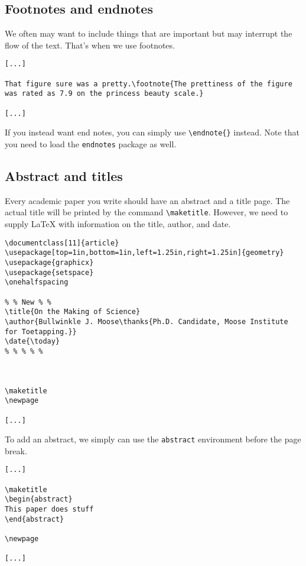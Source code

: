 \subsection{Footnotes and endnotes}

We often may want to include things that are important but may interrupt the flow of the text. That's when we use footnotes. 

\begin{lstlisting}
[...]

That figure sure was a pretty.\footnote{The prettiness of the figure was rated as 7.9 on the princess beauty scale.}

[...]
\end{lstlisting}

If you instead want end notes, you can simply use \verb|\endnote{}| instead. Note that you need to load the \texttt{endnotes} package as well.

\subsection{Abstract and titles}

Every academic paper you write should have an abstract and a title page. The actual title will be printed by the command \verb|\maketitle|. However, we need to supply \LaTeX{} with information on the title, author, and date.

\begin{lstlisting}
\documentclass[11]{article}
\usepackage[top=1in,bottom=1in,left=1.25in,right=1.25in]{geometry}
\usepackage{graphicx}
\usepackage{setspace}
\onehalfspacing

% % New % %
\title{On the Making of Science}
\author{Bullwinkle J. Moose\thanks{Ph.D. Candidate, Moose Institute for Toetapping.}}
\date{\today}
% % % % %



\maketitle
\newpage

[...]
\end{lstlisting}

To add an abstract, we simply can use the \texttt{abstract} environment before the page break.

\begin{lstlisting}
[...]

\maketitle
\begin{abstract}
This paper does stuff
\end{abstract}

\newpage

[...]
\end{lstlisting}


